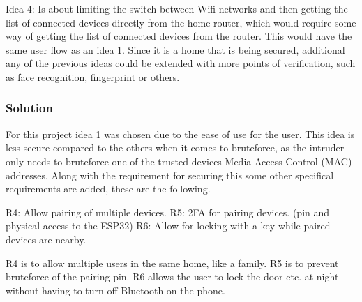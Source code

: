 Idea 4: Is about limiting the switch between Wifi networks and then getting the list of connected devices directly from the home router, which would require some way of getting the list of connected devices from the router. This would have the same user flow as an idea 1. Since it is a home that is being secured, additional any of the previous ideas could be extended with more points of verification, such as face recognition, fingerprint or others.

\subsubsection{Solution}
For this project idea 1 was chosen due to the ease of use for the user. This idea is less secure compared to the others when it comes to bruteforce, as the intruder only needs to bruteforce one of the trusted devices Media Access Control (MAC) addresses. Along with the requirement for securing this some other specifical requirements are added, these are the following.

R4: Allow pairing of multiple devices.
R5: 2FA for pairing devices. (pin and physical access to the ESP32)
R6: Allow for locking with a key while paired devices are nearby.

R4 is to allow multiple users in the same home, like a family. R5 is to prevent bruteforce of the pairing pin. R6 allows the user to lock the door etc. at night without having to turn off Bluetooth on the phone.
